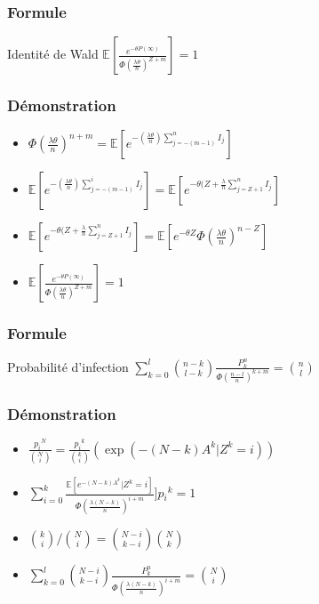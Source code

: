 \begin{frame}
	\frametitle{Formule}
	\begin{block}{Identité de Wald}
          $\mathbb{E}[ \frac{ e^{-\theta P(\infty)} }{ \Phi( \frac{\lambda \theta}{n})^{Z + m} } ] = 1 $
	\end{block}	
\end{frame}

\begin{frame}
	\frametitle{Démonstration}
	\begin{itemize}
	\item $ \Phi( \frac{\lambda \theta}{n})^{n + m} = \mathbb{E}[e^{-(\frac{\lambda \theta}{n}) \sum^n_{j = - (m-1)} I_j }]$
	\item $ \mathbb{E}[e^{-(\frac{\lambda \theta}{n}) \sum^i_{j = - (m-1)} I_j }]= \mathbb{E}[e^{- \theta(Z+\frac{\lambda}{n} \sum^n_{j = Z+1} I_j }]$
	\item $\mathbb{E}[e^{- \theta(Z+\frac{\lambda}{n} \sum^n_{j = Z+1} I_j }]=\mathbb{E}[e^{- \theta Z}\Phi( \frac{\lambda \theta}{n})^{n - Z}]$
	\item $\mathbb{E}[ \frac{ e^{-\theta P(\infty)} }{ \Phi( \frac{\lambda \theta}{n})^{Z + m} } ] = 1$
	\end{itemize}
\end{frame}

\begin{frame}
	\frametitle{Formule}
	
	\begin{block}{Probabilité d'infection }
          $\sum_{k=0}^{l}\binom{n-k}{l-k}\frac{P_{k}^{n}}{\Phi( \frac{n-l}{n})^{k + m} }=\binom{n}{l}$
	\end{block}

\end{frame}

\begin{frame}
	\frametitle{Démonstration}
	\begin{itemize}
	\item $ \frac{{p_{i}}^{N}}{\binom{N}{i}}= \frac{{p_{i}}^{k}}{\binom{k}{i}}\left ( \exp(-(N-k)A^{k}|Z^{k}=i)  \right )$
	\item $\sum_{i=0}^{k} \frac{ \mathbb{E}[e^{-(N-k) A^{k}}|Z^{k}=i ]}{ \Phi( \frac{\lambda (N-k)}{n})^{i + m} } ]p{_{i}}^{k} = 1$
	\item $\binom{k}{i}/\binom{N}{i} = \binom{N-i}{k-i}\binom{N}{k}$
	\item $\sum_{k=0}^{l}\binom{N-i}{k-i}\frac{P_{k}^{n}}{\Phi( \frac{\lambda (N-k)}{n})^{i + m} }=\binom{N}{i}$
	\end{itemize}
\end{frame}


